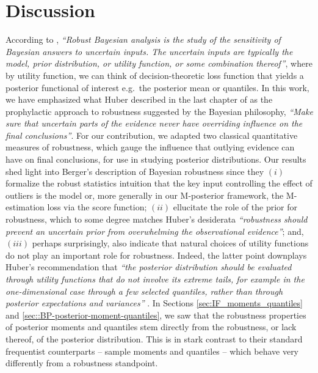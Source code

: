 \documentclass[11pt, oneside]{amsart}
\theoremstyle{definition}   %
\begin{document}
\section{Discussion}
%
According to \cite{berger1994}, \emph{``Robust Bayesian analysis is the study of the sensitivity of Bayesian answers to uncertain inputs. The uncertain inputs are typically the model, prior distribution, or utility function, or some combination thereof''}, where by utility function, we can think of decision-theoretic loss function that yields a posterior functional of interest e.g.\ the posterior mean or quantiles.  In this work, we have emphasized what Huber described in the last chapter of \cite[page 327]{huber:ronchetti2009} as the prophylactic approach to robustness suggested by the Bayesian philosophy, \emph{``Make sure that uncertain parts of the evidence never have overriding influence on the final conclusions''}.  For our contribution, we adapted two classical quantitative measures of robustness, which gauge the influence that outlying evidence can have on final conclusions, for use in studying posterior distributions.  
%
Our results shed light into Berger's description of Bayesian robustness since they $(i)$ formalize the robust statistics intuition that the key input controlling the effect of outliers is the model or, more generally in our M-posterior framework, the M-estimation loss via the score function; $(ii)$ ellucitate the role of the prior for robustness,  which to some degree matches Huber's desiderata \emph{``robustness should prevent an uncertain prior from overwhelming the observational evidence''}; and, $(iii)$ perhaps surprisingly, also indicate that natural choices of utility functions do not play an important role for robustness. Indeed, the latter point downplays Huber's recommendation  that \emph{``the posterior distribution should be evaluated through utility functions that do not involve its extreme tails, for example in the one-dimensional case through a few selected quantiles, rather than through posterior expectations and variances''} \cite[page 329]{huber:ronchetti2009}. 
%
In Sections \ref{sec:IF_moments_quantiles} and \ref{sec::BP-posterior-moment-quantiles}, we saw that the robustness properties of posterior moments and quantiles stem directly from the robustness, or lack thereof, of the posterior distribution. This is in stark contrast to their standard frequentist counterparts -- sample moments and quantiles -- which behave very differently from a robustness standpoint. 
\end{document}
